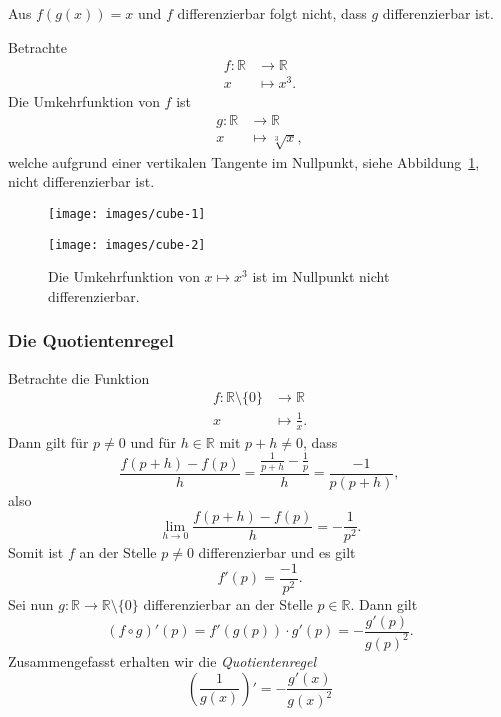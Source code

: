 \documentclass[../main.tex]{subfiles}
\begin{document}
\begin{warning}
  Aus $f(g(x)) = x$ und $f$ differenzierbar
  folgt nicht, dass $g$ differenzierbar ist.
\end{warning}

\begin{example}
  Betrachte
  \begin{align*}
    f \colon \mathbb{R} & \to \mathbb{R} \\
    x & \mapsto x^3.
  \end{align*}
  Die Umkehrfunktion von $f$ ist
  \begin{align*}
    g \colon \mathbb{R} & \to \mathbb{R} \\
    x & \mapsto \sqrt[3]{x},
  \end{align*}
  welche aufgrund einer vertikalen Tangente im
  Nullpunkt, siehe Abbildung~\ref{fig:cube},
  nicht differenzierbar ist.

\end{example}

\begin{figure}[htb]
  \centering
  \begin{minipage}{0.40\textwidth}
    \centering
    \texttt{[image: images/cube-1]}
  \end{minipage}%
  \begin{minipage}{0.40\textwidth}
    \centering
    \texttt{[image: images/cube-2]}
  \end{minipage}%
  \caption{Die Umkehrfunktion von $x \mapsto x^3$
  ist im Nullpunkt nicht differenzierbar.}%
  \label{fig:cube}
\end{figure}

\subsubsection*{Die Quotientenregel}
Betrachte die Funktion
\begin{align*}
  f \colon \mathbb{R} \setminus \{0\} & \to \mathbb{R} \\
  x & \mapsto \frac{1}{x}.
\end{align*}
Dann gilt für
$p \neq 0$ und für $h \in \mathbb{R}$ mit $p + h \neq 0$, dass
\[
  \frac{f(p+h) - f(p)}{h} = \frac{\frac{1}{p+h} - \frac{1}{p}}{h}
  = \frac{-1}{p(p+h)},
\]
also
\[
  \lim_{h \to 0} \frac{f(p+h) - f(p)}{h} = - \frac{1}{p^2}.
\]
Somit ist $f$ an der Stelle
$p \neq 0$ differenzierbar und es gilt
\[
  f'(p) = \frac{-1}{p^2}.
\]
Sei nun $g \colon \mathbb{R} \to \mathbb{R} \setminus \{0\}$
differenzierbar an der Stelle $p \in \mathbb{R}$.
Dann gilt
\[
  (f \circ g)'(p) = f'(g(p)) \cdot g'(p)
  = -\frac{g'(p)}{{g(p)}^2}.
\]
Zusammengefasst erhalten wir die \emph{Quotientenregel}
\[
  \left( \frac{1}{g(x)} \right)' = -\frac{g'(x)}{{g(x)}^2}
\]
\end{document}
